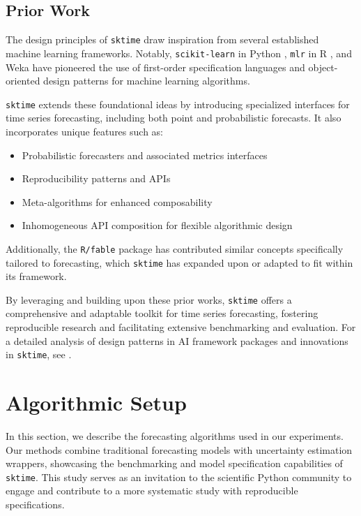 \subsection{Prior Work}
The design principles of \texttt{sktime} draw inspiration from several established machine learning frameworks. Notably, \texttt{scikit-learn} in Python \cite{pedregosa2011scikit}, \texttt{mlr} in R \cite{bischl2016mlr}, and Weka \cite{hall2009weka} have pioneered the use of first-order specification languages and object-oriented design patterns for machine learning algorithms. 

\texttt{sktime} extends these foundational ideas by introducing specialized interfaces for time series forecasting, including both point and probabilistic forecasts. It also incorporates unique features such as:
\begin{itemize}
    \item Probabilistic forecasters and associated metrics interfaces
    \item Reproducibility patterns and APIs
    \item Meta-algorithms for enhanced composability
    \item Inhomogeneous API composition for flexible algorithmic design
\end{itemize}

Additionally, the \texttt{R/fable} package \cite{hyndman2020package} has contributed similar concepts specifically tailored to forecasting, which \texttt{sktime} has expanded upon or adapted to fit within its framework.

By leveraging and building upon these prior works, \texttt{sktime} offers a comprehensive and adaptable toolkit for time series forecasting, fostering reproducible research and facilitating extensive benchmarking and evaluation.
For a detailed analysis of design patterns in AI framework packages and innovations in \texttt{sktime}, see \cite{kiraly2021designing}.

\section{Algorithmic Setup} \label{methods}

In this section, we describe the forecasting algorithms used in our experiments. Our methods combine traditional forecasting models with uncertainty estimation wrappers, showcasing the benchmarking and model specification capabilities of \texttt{sktime}. This study serves as an invitation to the scientific Python community to engage and contribute to a more systematic study with reproducible specifications.

